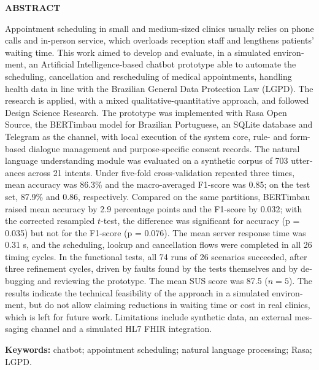 \documentclass[12pt,a4paper]{extarticle}
\begin{document}
\newpage
\begin{otherlanguage}{english}
\thispagestyle{empty}
\begin{center}
    \textbf{ABSTRACT}
\end{center}
\vspace{0.5cm}

\noindent Appointment scheduling in small and medium-sized clinics usually relies on phone calls and in-person service, which overloads reception staff and lengthens patients' waiting time. This work aimed to develop and evaluate, in a simulated environment, an Artificial Intelligence-based chatbot prototype able to automate the scheduling, cancellation and rescheduling of medical appointments, handling health data in line with the Brazilian General Data Protection Law (LGPD). The research is applied, with a mixed qualitative-quantitative approach, and followed Design Science Research. The prototype was implemented with Rasa Open Source, the BERTimbau model for Brazilian Portuguese, an SQLite database and Telegram as the channel, with local execution of the system core, rule- and form-based dialogue management and purpose-specific consent records. The natural language understanding module was evaluated on a synthetic corpus of 703 utterances across 21 intents. Under five-fold cross-validation repeated three times, mean accuracy was 86.3\% and the macro-averaged F1-score was 0.85; on the test set, 87.9\% and 0.86, respectively. Compared on the same partitions, BERTimbau raised mean accuracy by 2.9 percentage points and the F1-score by 0.032; with the corrected resampled $t$-test, the difference was significant for accuracy (p = 0.035) but not for the F1-score (p = 0.076). The mean server response time was 0.31 s, and the scheduling, lookup and cancellation flows were completed in all 26 timing cycles. In the functional tests, all 74 runs of 26 scenarios succeeded, after three refinement cycles, driven by faults found by the tests themselves and by debugging and reviewing the prototype. The mean SUS score was 87.5 ($n = 5$). The results indicate the technical feasibility of the approach in a simulated environment, but do not allow claiming reductions in waiting time or cost in real clinics, which is left for future work. Limitations include synthetic data, an external messaging channel and a simulated HL7 FHIR integration.

\vspace{0.5cm}
\noindent \textbf{Keywords:} chatbot; appointment scheduling; natural language processing; Rasa; LGPD.
\end{otherlanguage}
\end{document}
